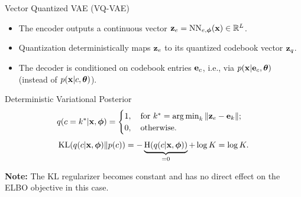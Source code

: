 \documentclass{beamer}
\begin{document}
\begin{frame}{Vector Quantized VAE (VQ-VAE)}
	\begin{itemize}
		\item The encoder outputs a continuous vector $\mathbf{z}_e = \text{NN}_{e, \boldsymbol{\phi}}(\mathbf{x}) \in \mathbb{R}^{L}$.
		\item Quantization deterministically maps $\mathbf{z}_e$ to its quantized codebook vector $\mathbf{z}_q$.
		\item The decoder is conditioned on codebook entries $\mathbf{e}_c$, i.e., via $p(\mathbf{x} | \mathbf{e}_c, \boldsymbol{\theta})$ (instead of $p(\mathbf{x} | c, \boldsymbol{\theta})$).
	\end{itemize}
	\begin{block}{Deterministic Variational Posterior}
		\vspace{-0.3cm}
		\[
			q(c = k^* | \mathbf{x}, \boldsymbol{\phi}) = \begin{cases}
				1 , \quad \text{for } k^* = \operatorname*{arg\,min}_k \| \mathbf{z}_e - \mathbf{e}_k \|; \\
				0, \quad \text{otherwise}.
		\end{cases}
		\]
		\[
			\mathrm{KL}(q(c | \mathbf{x}, \boldsymbol{\phi}) \| p(c)) = - \underbrace{\mathrm{H}(q(c | \mathbf{x}, \boldsymbol{\phi}))}_{=0} + \log K = \log K. 
		\]
	\end{block}	
	\vspace{-0.4cm}
	\textbf{Note:} The KL regularizer becomes constant and has no direct effect on the ELBO objective in this case.
\end{frame}
\end{document}
